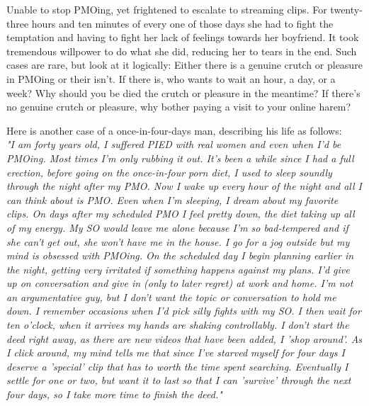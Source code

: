 \documentclass[easypeasy]{subfiles}
\begin{document}
Unable to stop PMOing, yet frightened to escalate to streaming clips. For twenty-three hours and ten minutes of every one of those days she had to fight the temptation and having to fight her lack of feelings towards her boyfriend. It took tremendous willpower to do what she did, reducing her to tears in the end. Such cases are rare, but look at it logically: Either there is a genuine crutch or pleasure in PMOing or their isn't. If there is, who wants to wait an hour, a day, or a week? Why should you be died the crutch or pleasure in the meantime? If there's no genuine crutch or pleasure, why bother paying a visit to your online harem?

  Here is another case of a once-in-four-days man, describing his life as follows:\\

  \textit{"I am forty years old, I suffered PIED with real women and even when I'd be PMOing. Most times I'm only rubbing it out. It's been a while since I had a full erection, before going on the once-in-four porn diet, I used to sleep soundly through the night after my PMO. Now I wake up every hour of the night and all I can think about is PMO. Even when I'm sleeping, I dream about my favorite clips. On days after my scheduled PMO I feel pretty down, the diet taking up all of my energy. My SO would leave me alone because I'm so bad-tempered and if she can't get out, she won't have me in the house. I go for a jog outside but my mind is obsessed with PMOing. On the scheduled day I begin planning earlier in the night, getting very irritated if something happens against my plans. I'd give up on conversation and give in (only to later regret) at work and home. I'm not an argumentative guy, but I don't want the topic or conversation to hold me down. I remember occasions when I'd pick silly fights with my SO. I then wait for ten o'clock, when it arrives my hands are shaking controllably. I don't start the deed right away, as there are new videos that have been added, I 'shop around'. As I click around, my mind tells me that since I've starved myself for four days I deserve a 'special' clip that has to worth the time spent searching. Eventually I settle for one or two, but want it to last so that I can 'survive' through the next four days, so I take more time to finish the deed."}
\end{document}
